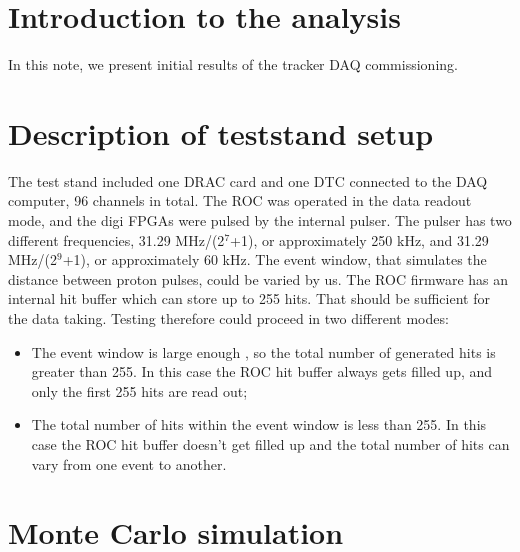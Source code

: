 \section {Introduction to the analysis}

In this note, we present initial results of the tracker DAQ commissioning.
\section{Description of teststand setup}
  The test stand included one DRAC card \cite{DRAC} and one DTC connected to the DAQ computer,
  96 channels in total.
  The ROC was operated in the data readout mode, and the digi FPGAs were pulsed by the internal pulser.
  The pulser has two different frequencies,  31.29 MHz/(2$^7$+1), or approximately 250 kHz,
  and 31.29 MHz/(2$^9$+1), or approximately 60 kHz.
  The event window, that simulates the distance between proton pulses, could be varied by us.
  The ROC firmware has an internal hit buffer which can store up to 255 hits.
  That should be sufficient for the data taking.
  Testing therefore could proceed in two different modes:
  \begin{itemize}
  \item
    The event window is large enough , so the total number of generated hits is greater than 255. In this case
    the ROC hit buffer always gets filled up, and only the first 255 hits are read out;
  \item
    The total number of hits within the event window is less than 255.
    In this case the ROC hit buffer doesn't get filled up and the total number of hits
    can vary from one event to another.
  \end{itemize}

\section{Monte Carlo simulation}\label{MonteCarlo}

